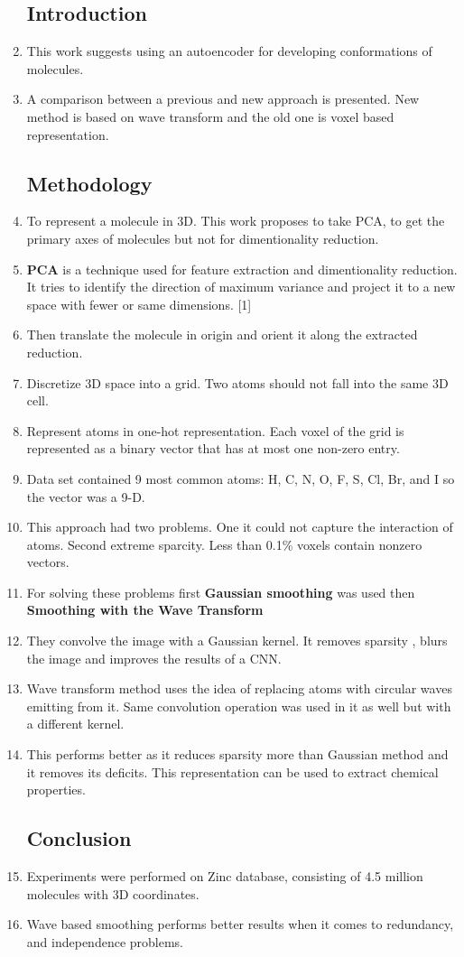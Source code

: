 \documentclass[]{report}
\begin{document}
\begin{enumerate}
	\subsection{Introduction}
	\item This work suggests using an autoencoder for developing conformations of molecules.
	\item A comparison between a previous and new approach is presented. New method is based on wave transform and the old one is voxel based representation.
	\subsection{Methodology}
	\item To represent a molecule in 3D. This work proposes to take PCA, to get the primary axes of molecules but not for dimentionality reduction. 
	\item \textbf{PCA} is a technique used for feature extraction and dimentionality reduction. It tries to identify the direction of maximum variance and project it to a new space with fewer or same dimensions. [1]
	\item Then translate the molecule in origin and orient it along the extracted reduction. 
	\item Discretize 3D space into a grid. Two atoms should not fall into the same 3D cell.
	\item Represent atoms in one-hot representation. Each voxel of the grid is represented as a binary vector that has at most one non-zero entry.
	\item Data set contained 9 most common atoms: H, C, N, O, F, S, Cl, Br, and I so the vector was a 9-D.
	\item This approach had two problems. One it could not capture the interaction of atoms. Second extreme sparcity. Less than 0.1\% voxels contain nonzero vectors.
	\item For solving these problems first \textbf{Gaussian smoothing} was used then \textbf{Smoothing with the Wave Transform}
	\item They convolve the  image with a Gaussian kernel. It removes sparsity , blurs the image and improves the results of a CNN.
	\item Wave transform method uses the idea of replacing atoms with circular waves emitting from it. Same convolution operation was used in it as well but with a different kernel.
	\item This performs better as it reduces sparsity more than Gaussian method and it removes its deficits. This representation can be used to extract chemical properties.
	\subsection{Conclusion}
	\item Experiments were performed on Zinc database, consisting of 4.5 million molecules with 3D coordinates.
	\item Wave based smoothing performs better results when it comes to redundancy, and independence problems.
\end{enumerate}
\end{document}
